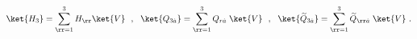 \begin{equation} \label{nqh}
\ket{H_3} = \sum_{\rr=1}^3 H_\rr \ket{V}~~,~~ 
\ket{Q_{3\dot{a}}} = \sum_{\rr=1}^3 Q_{r \dot{a}}\; \ket{V}~~,~~
\ket{\widetilde{Q}_{3\dot{a}}} = \sum_{\rr=1}^3 \widetilde{Q}_{\rr
\dot{a}}\; \ket{V}~.
\end{equation}

